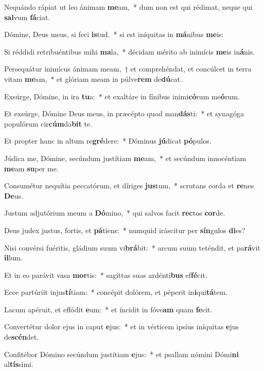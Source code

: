 \item Nequándo rápiat ut leo ánimam \textbf{me}am,~* dum non est qui rédimat, neque qui \textbf{sal}vum \textbf{fá}ciat.
\item Dómine, Deus meus, si feci \textbf{is}tud.~* si est iníquitas in \textbf{má}nibus \textbf{me}is:
\item Si réddidi retribuéntibus mihi \textbf{ma}la,~* décidam mérito ab inimícis \textbf{me}is in\textbf{á}nis.
\item Persequátur inimícus ánimam meam,~† et comprehéndat, et concúlcet in terra vitam \textbf{me}am,~* et glóriam meam in púlve\textbf{rem} de\textbf{dú}cat.
\item Exsúrge, Dómine, in ira \textbf{tu}a:~* et exaltáre in fínibus inimi\textbf{có}rum me\textbf{ó}rum.
\item Et exsúrge, Dómine Deus meus, in præcépto quod man\textbf{dás}ti:~* et synagóga populórum cir\textbf{cúm}da\textbf{bit} te.
\item Et propter hanc in altum re\textbf{gré}dere:~* Dóminus \textbf{jú}dicat \textbf{pó}pulos.
\item Júdica me, Dómine, secúndum justítiam \textbf{me}am,~* et secúndum innocéntiam \textbf{me}am \textbf{su}per me.
\item Consumétur nequítia peccatórum, et díriges \textbf{jus}tum,~* scrutans corda et \textbf{re}nes \textbf{De}us.
\item Justum adjutórium meum a \textbf{Dó}mino,~* qui salvos facit \textbf{rec}tos \textbf{cor}de.
\item Deus judex justus, fortis, et \textbf{pá}tiens:~* numquid iráscitur per \textbf{sín}gulos \textbf{di}es?
\item Nisi convérsi fuéritis, gládium suum vi\textbf{brá}bit:~* arcum suum teténdit, et pa\textbf{rá}vit \textbf{il}lum.
\item Et in eo parávit vasa \textbf{mor}tis:~* sagíttas suas ardénti\textbf{bus} ef\textbf{fé}cit.
\item Ecce partúriit injus\textbf{tí}tiam:~* concépit dolórem, et péperit in\textbf{i}qui\textbf{tá}tem.
\item Lacum apéruit, et effódit \textbf{e}um:~* et íncidit in fóve\textbf{am} quam \textbf{fe}cit.
\item Convertétur dolor ejus in caput \textbf{e}jus:~* et in vérticem ipsíus iníquitas \textbf{e}jus de\textbf{scén}det.
\item Confitébor Dómino secúndum justítiam \textbf{e}jus:~* et psallam nómini Dómi\textbf{ni} al\textbf{tís}simi.
